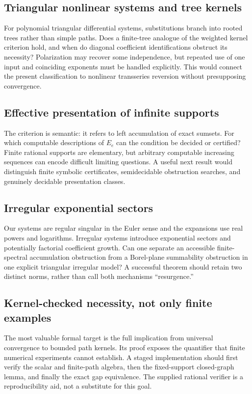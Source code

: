 \documentclass[11pt,a4paper]{article}
\numberwithin{equation}{section}
\theoremstyle{definition}
\theoremstyle{remark}
\begin{document}
\subsection{Triangular nonlinear systems and tree kernels}
For polynomial triangular differential systems, substitutions branch into
rooted trees rather than simple paths. Does a finite-tree analogue of the
weighted kernel criterion hold, and when do diagonal coefficient
identifications obstruct its necessity? Polarization may recover some
independence, but repeated use of one input and coinciding exponents must
be handled explicitly. This would connect the present classification to
nonlinear transseries reversion without presupposing convergence.

\subsection{Effective presentation of infinite supports}
The criterion is semantic: it refers to left accumulation of exact
sumsets. For which computable descriptions of $E_e$ can the condition be
decided or certified? Finite rational supports are elementary, but arbitrary
computable increasing sequences can encode difficult limiting questions.
A useful next result would distinguish finite symbolic certificates,
semidecidable obstruction searches, and genuinely decidable presentation
classes.

\subsection{Irregular exponential sectors}
Our systems are regular singular in the Euler sense and the expansions
use real powers and logarithms. Irregular systems introduce exponential
sectors and potentially factorial coefficient growth. Can one separate
an accessible finite-spectral accumulation obstruction from a Borel-plane
summability obstruction in one explicit triangular irregular model?
A successful theorem should retain two distinct norms, rather than call
both mechanisms ``resurgence.''

\subsection{Kernel-checked necessity, not only finite examples}
The most valuable formal target is the full implication from universal
convergence to bounded path kernels. Its proof exposes the quantifier that
finite numerical experiments cannot establish. A staged implementation
should first verify the scalar and finite-path algebra, then the
fixed-support closed-graph lemma, and finally the exact gap equivalence.
The supplied rational verifier is a reproducibility aid, not a substitute
for this goal.
\end{document}
